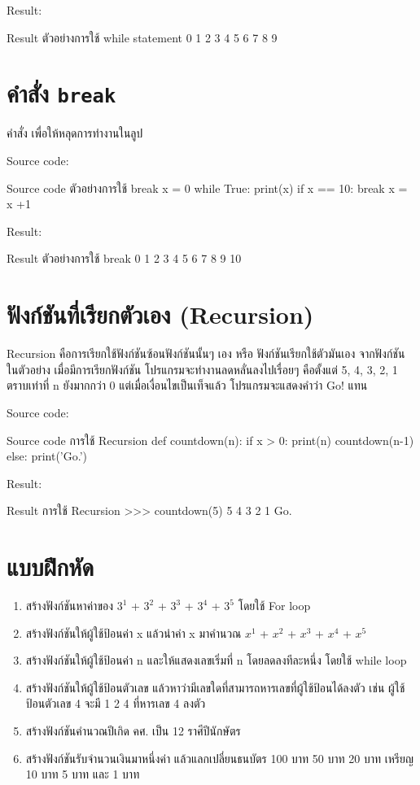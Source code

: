 Result:
\begin{codelist}{Result ตัวอย่างการใช้ while statement}{}
0
1
2
3
4
5
6
7
8
9
\end{codelist}

\section{คำสั่ง \texttt{break}}

คำสั่ง   เพื่อให้หลุดการทำงานในลูป

Source code:
\begin{codelist}{Source code ตัวอย่างการใช้ break}{}
x = 0
while True:
    print(x)
    if x == 10: break
    x = x +1
\end{codelist}

Result:
\begin{codelist}{Result ตัวอย่างการใช้ break}{}
0
1
2
3
4
5
6
7
8
9
10
\end{codelist}


\section{ฟังก์ชันที่เรียกตัวเอง (Recursion)}

Recursion คือการเรียกใช้ฟังก์ชันซ้อนฟังก์ชันนั้นๆ เอง หรือ ฟังก์ชันเรียกใช้ตัวมันเอง จากฟังก์ชัน   ในตัวอย่าง เมื่อมีการเรียกฟังก์ชัน   โปรแกรมจะทำงานลดหลั่นลงไปเรื่อยๆ คือตั้งแต่ 5, 4, 3, 2, 1 ตราบเท่าที่ n ยังมากกว่า 0 แต่เมื่อเงื่อนไขเป็นเท็จแล้ว โปรแกรมจะแสดงคำว่า Go! แทน

Source code:
\begin{codelist}{Source code  การใช้ Recursion}{}
def countdown(n):
    if x > 0:
        print(n)
        countdown(n-1)
    else:
        print('Go.')
\end{codelist}
Result:
\begin{codelist}{Result  การใช้ Recursion}{}
>>> countdown(5)
5
4
3
2
1
Go.
\end{codelist}


\section{แบบฝึกหัด}
\begin{enumerate} 

\item 	สร้างฟังก์ชันหาค่าของ  $3^1$ + $3^2$ + $3^3$ + $3^4$ + $3^5$  โดยใช้ For loop
\item 	สร้างฟังก์ชันให้ผู้ใช้ป้อนค่า x แล้วนำค่า x มาคำนวณ $x^1$ + $x^2$ + $x^3$ + $x^4$ + $x^5$
\item 	สร้างฟังก์ชันให้ผู้ใช้ป้อนค่า n และให้แสดงเลขเริ่มที่ n โดยลดลงทีละหนึ่ง โดยใช้ while loop
\item 	สร้างฟังก์ชันให้ผู้ใช้ป้อนตัวเลข แล้วหาว่ามีเลขใดที่สามารถหารเลขที่ผู้ใช้ป้อนได้ลงตัว เช่น ผู้ใช้ป้อนตัวเลข 4 จะมี 1 2 4 ที่หารเลข 4 ลงตัว
\item 	สร้างฟังก์ชันคำนวณปีเกิด คศ. เป็น 12 ราศีปีนักษัตร
\item 	สร้างฟังก์ชันรับจำนวนเงินมาหนึ่งค่า แล้วแลกเปลี่ยนธนบัตร 100 บาท 50 บาท 20 บาท เหรียญ 10 บาท 5 บาท และ 1 บาท
\end{enumerate}